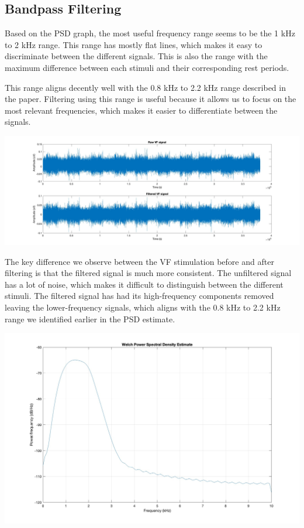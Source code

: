 \documentclass[12pt]{article}
\begin{document}
\subsection{Bandpass Filtering}
Based on the PSD graph, the most useful frequency range seems to be the 1 kHz to 2 kHz range. This range has mostly flat lines, which makes it easy to discriminate between the different signals. This is also the range with the maximum difference between each stimuli and their corresponding rest periods.

This range aligns decently well with the 0.8 kHz to 2.2 kHz range described in the paper. Filtering using this range is useful because it allows us to focus on the most relevant frequencies, which makes it easier to differentiate between the signals.

\begin{center}
    \includegraphics[width=\textwidth]{filtered_vf_signal.jpg}
\end{center}

The key difference we observe between the VF stimulation before and after filtering is that the filtered signal is much more consistent. The unfiltered signal has a lot of noise, which makes it difficult to distinguish between the different stimuli. The filtered signal has had its high-frequency components removed leaving the lower-frequency signals, which aligns with the 0.8 kHz to 2.2 kHz range we identified earlier in the PSD estimate.

\begin{center}
    \includegraphics[width=\textwidth]{filtered_vf_psd.jpg}
\end{center}
\end{document}
